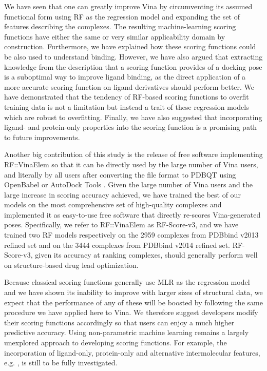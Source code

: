 We have seen that one can greatly improve Vina by circumventing its assumed functional form using RF as the regression model and expanding the set of features describing the complexes. The resulting machine-learning scoring functions have either the same or very similar applicability domain by construction. Furthermore, we have explained how these scoring functions could be also used to understand binding. However, we have also argued that extracting knowledge from the description that a scoring function provides of a docking pose is a suboptimal way to improve ligand binding, as the direct application of a more accurate scoring function on ligand derivatives should perform better. We have demonstrated that the tendency of RF-based scoring functions to overfit training data is not a limitation but instead a trait of these regression models which are robust to overfitting. Finally, we have also suggested that incorporating ligand- and protein-only properties into the scoring function is a promising path to future improvements.

Another big contribution of this study is the release of free software implementing RF::VinaElem so that it can be directly used by the large number of Vina users, and literally by all users after converting the file format to PDBQT using OpenBabel \citep{968} or AutoDock Tools \citep{596}. Given the large number of Vina users and the large increase in scoring accuracy achieved, we have trained the best of our models on the most comprehensive set of high-quality complexes and implemented it as easy-to-use free software that directly re-scores Vina-generated poses. Specifically, we refer to RF::VinaElem as RF-Score-v3, and we have trained two RF models respectively on the 2959 complexes from PDBbind v2013 refined set and on the 3444 complexes from PDBbind v2014 refined set. RF-Score-v3, given its accuracy at ranking complexes, should generally perform well on structure-based drug lead optimization.

Because classical scoring functions generally use MLR as the regression model and we have shown its inability to improve with larger sizes of structural data, we expect that the performance of any of these will be boosted by following the same procedure we have applied here to Vina. We therefore suggest developers modify their scoring functions accordingly so that users can enjoy a much higher predictive accuracy. Using non-parametric machine learning remains a largely unexplored approach to developing scoring functions. For example, the incorporation of ligand-only, protein-only and alternative intermolecular features, e.g. \citep{1303}, is still to be fully investigated.

